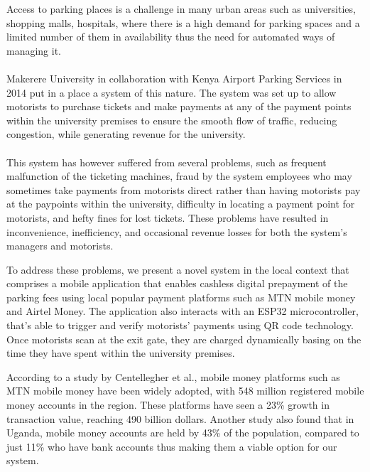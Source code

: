 Access to parking places is a challenge in many urban areas such as universities, shopping malls, hospitals, where there is a high demand for parking spaces and a limited number of them in availability\cite{parmar_study_2020} thus the need for automated ways of managing it.\\\\
Makerere University in collaboration with Kenya Airport Parking Services in 2014 put in a place a system of this nature. The system was set up to allow motorists to purchase tickets and make payments at any of the payment points within the university premises to ensure the smooth flow of traffic, reducing congestion, while generating revenue for the university\cite{wamai_mak_2014}.\\\\ This system has however suffered from several problems, such as frequent malfunction of the ticketing machines, fraud by the system employees who may sometimes take payments from motorists direct rather than having motorists pay at the paypoints within the university, difficulty in locating a payment point for motorists, and hefty fines for lost tickets. These problems have resulted in inconvenience, inefficiency, and occasional revenue losses for both the system’s managers and motorists.

To address these problems, we present a novel system in the local context that comprises a mobile application that enables cashless digital prepayment of the parking fees using local popular payment platforms such as MTN mobile money and Airtel Money. The application also interacts with an ESP32 microcontroller, that's able to trigger and verify motorists' payments using QR code technology. Once motorists scan at the exit gate, they are charged dynamically basing on the time they have spent within the university premises.

According to a study by Centellegher et al.\cite{centellegher_mobile_2018}, mobile money platforms such as MTN mobile money have been widely adopted, with 548 million registered mobile money accounts in the region. These platforms have seen a 23\% growth in transaction value, reaching 490 billion dollars. Another study also found that in Uganda, mobile money accounts are held by 43\% of the population, compared to just 11\% who have bank accounts\cite{baah_state_2021} thus making them a viable option for our system.

